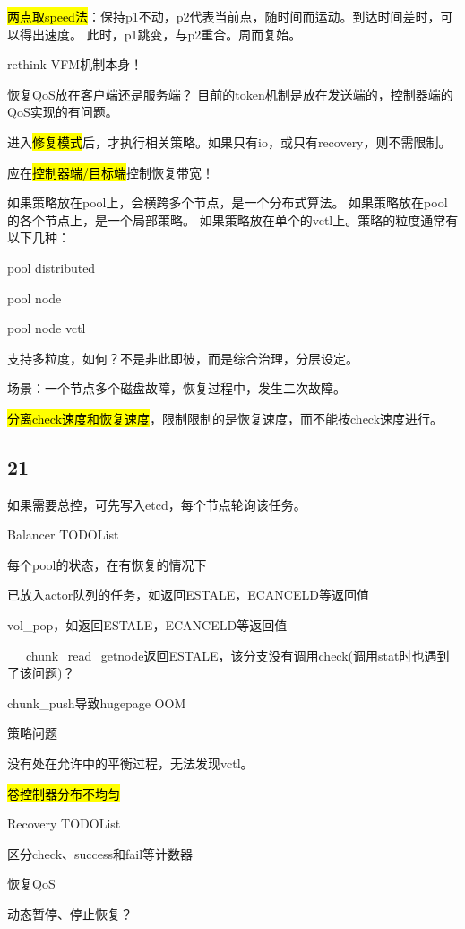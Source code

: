 \hl{两点取speed法}：保持p1不动，p2代表当前点，随时间而运动。到达时间差时，可以得出速度。
此时，p1跳变，与p2重合。周而复始。

rethink VFM机制本身！

恢复QoS放在客户端还是服务端？ 目前的token机制是放在发送端的，控制器端的QoS实现的有问题。

进入\hl{修复模式}后，才执行相关策略。如果只有io，或只有recovery，则不需限制。

应在\hl{控制器端/目标端}控制恢复带宽！

如果策略放在pool上，会横跨多个节点，是一个分布式算法。
如果策略放在pool的各个节点上，是一个局部策略。
如果策略放在单个的vctl上。策略的粒度通常有以下几种：
\begin{enumbox}
\item pool distributed
\item pool node
\item pool node vctl
\end{enumbox}

支持多粒度，如何？不是非此即彼，而是综合治理，分层设定。

场景：一个节点多个磁盘故障，恢复过程中，发生二次故障。

\hl{分离check速度和恢复速度}，限制限制的是恢复速度，而不能按check速度进行。

\subsection{21}

如果需要总控，可先写入etcd，每个节点轮询该任务。

Balancer TODOList
\begin{enumbox}
\item 每个pool的状态，在有恢复的情况下
\item 已放入actor队列的任务，如返回ESTALE，ECANCELD等返回值
\item vol\_pop，如返回ESTALE，ECANCELD等返回值
\item \_\_chunk\_read\_getnode返回ESTALE，该分支没有调用check(调用stat时也遇到了该问题)？
\item chunk\_push导致hugepage OOM
\item 策略问题
\item 没有处在允许中的平衡过程，无法发现vctl。
\item \hl{卷控制器分布不均匀}
\end{enumbox}

Recovery TODOList
\begin{enumbox}
\item 区分check、success和fail等计数器
\item 恢复QoS
\item 动态暂停、停止恢复？
\end{enumbox}

